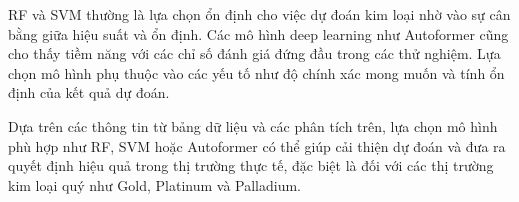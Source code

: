RF và SVM thường là lựa chọn ổn định cho việc dự đoán kim loại nhờ vào sự cân bằng giữa hiệu suất và ổn định. Các mô hình deep learning như Autoformer cũng cho thấy tiềm năng với các chỉ số đánh giá đứng đầu trong các thử nghiệm. Lựa chọn mô hình phụ thuộc vào các yếu tố như độ chính xác mong muốn và tính ổn định của kết quả dự đoán.

Dựa trên các thông tin từ bảng dữ liệu và các phân tích trên, lựa chọn mô hình phù hợp như RF, SVM hoặc Autoformer có thể giúp cải thiện dự đoán và đưa ra quyết định hiệu quả trong thị trường thực tế, đặc biệt là đối với các thị trường kim loại quý như Gold, Platinum và Palladium.
